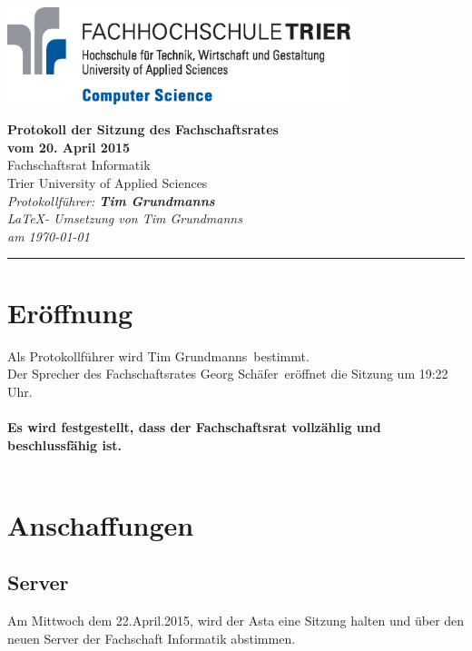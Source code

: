 \documentclass[a4paper, 11pt]{article} %
\newcommand{\protokoller}{Tim Grundmanns}
\newcommand{\dateOfMeeting}{20. April 2015}
\newcommand{\TeXer}{Tim  Grundmanns}
\newcommand{\fsiPresident}{Georg Schäfer}
\begin{document}

\doublespacing
\thispagestyle{empty}

\begin{center}
\includegraphics[width=10.0cm]{../logo_faculty_computer_science.eps}

\vspace*{\fill}
{\LARGE \textbf{Protokoll der Sitzung des Fachschaftsrates \\vom \dateOfMeeting}}\\
Fachschaftsrat Informatik\\
Trier University of Applied Sciences\\
\vspace{2.5cm}
\textit{
	Protokollführer: \textbf{\protokoller} \\
	\LaTeX - Umsetzung von \TeXer\\
	am \today
}
\vfill
\end{center}

\hspace*{-35cm}
\textcolor{fsi}{\rule{64.9cm}{15pt}}
\pagebreak
 
\setcounter{tocdepth}{2}
\tableofcontents 
\pagebreak

\section{Eröffnung}
Als Protokollführer wird \protokoller~bestimmt.\\
Der Sprecher des Fachschaftsrates \fsiPresident~eröffnet die Sitzung um 19:22 Uhr.
\\\\
\textbf{Es wird festgestellt, dass der Fachschaftsrat vollzählig und beschlussfähig ist.}
\\\\
\pagebreak
\section{Anschaffungen}
\subsection{Server}
Am Mittwoch dem 22.April.2015, wird der Asta eine Sitzung halten und über den neuen Server der Fachschaft Informatik abstimmen.
\end{document}
